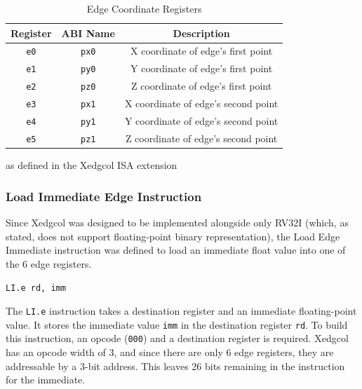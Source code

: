     \begin{table}[H]
    \begin{center}
    \begin{tabular}{|c|c|c|}
    \hline
    \textbf{Register} & \textbf{ABI Name} & \textbf{Description} \\
    \hline
    \texttt{e0}     & \texttt{px0}      & X coordinate of edge's first point \\
    \hline
    \texttt{e1}     & \texttt{py0}      & Y coordinate of edge's first point \\
    \hline
    \texttt{e2}     & \texttt{pz0}      & Z coordinate of edge's first point \\
    \hline
    \texttt{e3}     & \texttt{px1}      & X coordinate of edge's second point \\
    \hline
    \texttt{e4}     & \texttt{py1}      & Y coordinate of edge's second point \\
    \hline
    \texttt{e5}     & \texttt{pz1}      & Z coordinate of edge's second point \\
    \hline
    \end{tabular}
    \caption{Edge Coordinate Registers}{ as defined in the Xedgcol ISA extension}
    \label{table:edge_registers}
    \end{center}
    \end{table}

    \subsubsection{Load Immediate Edge Instruction}
    Since Xedgcol was designed to be implemented alongside only RV32I (which, as stated, does not support floating-point binary representation), the Load Edge Immediate instruction was defined to load an immediate float value into one of the 6 edge registers. 

    \begin{center}
    \texttt{LI.e rd, imm}
    \end{center}

    The \texttt{LI.e} instruction takes a destination register and an immediate floating-point value. It stores the immediate value \texttt{imm} in the destination register \texttt{rd}.
    To build this instruction, an opcode (\texttt{000}) and a destination register is required. Xedgcol has an opcode width of 3, and since there are only 6 edge registers, they are addressable by a 3-bit address. This leaves 26 bits remaining in the instruction for the immediate. \\


